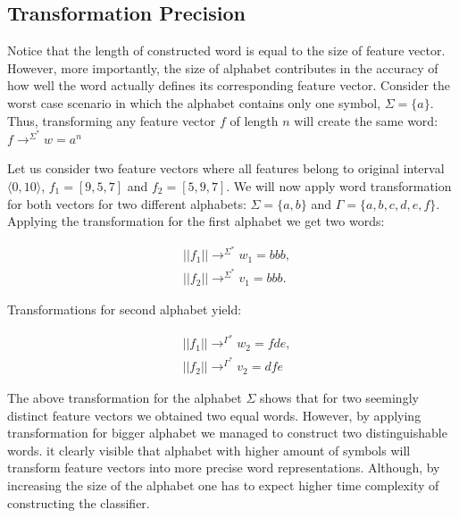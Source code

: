 \documentclass{mini}
\newcommand{\featureTransformationWord}[1]{
    \rightarrow^{#1^{*}}
}
\newcommand{\featureNorm}[1]{
    ||#1||
}
\begin{document}
\subsection{Transformation Precision}\label{sec:lan_theory_transf_prec}

Notice that the length of constructed word is equal to the size of feature vector. However, more importantly, the size of alphabet contributes in the accuracy of how well the word actually defines its corresponding feature vector. Consider the worst case scenario in which the alphabet contains only one symbol, $\Sigma=\{a\}$. Thus, transforming any feature vector $f$ of length $n$ will create the same word: $f \featureTransformationWord{\Sigma} w = a^{n}$


\begin{example} \label{ex:transf_prec}
    Let us consider two feature vectors where all features belong to original interval $\langle 0, 10 \rangle$, $f_1=[9, 5, 7]$ and $f_2=[5,9,7]$. We will now apply word transformation for both vectors for two different alphabets: $\Sigma=\{a,b\}$ and $\Gamma=\{a,b,c,d,e,f\}$. Applying the transformation for the first alphabet we get two words: 
    
    \begin{center}
        \begin{align*}
        &\featureNorm{f_1} \featureTransformationWord{\Sigma} w_1 = bbb, \\ &\featureNorm{f_2} \featureTransformationWord{\Sigma} v_1 = bbb.
        \end{align*}
    \end{center}
    
    Transformations for second alphabet yield: 
    
    \begin{center}
        \begin{align*}
        &\featureNorm{f_1} \featureTransformationWord{\Gamma} w_2 = fde, \\ &\featureNorm{f_2} \featureTransformationWord{\Gamma} v_2 = dfe
        \end{align*}
    \end{center}
\end{example}

The above transformation for the alphabet $\Sigma$ shows that for two seemingly distinct feature vectors we obtained two equal words. However, by applying transformation for bigger alphabet we managed to construct two distinguishable words.
it clearly visible that alphabet with higher amount of symbols will transform feature vectors into more precise word representations. Although, by increasing the size of the alphabet one has to expect higher time complexity of constructing the classifier.
\end{document}
